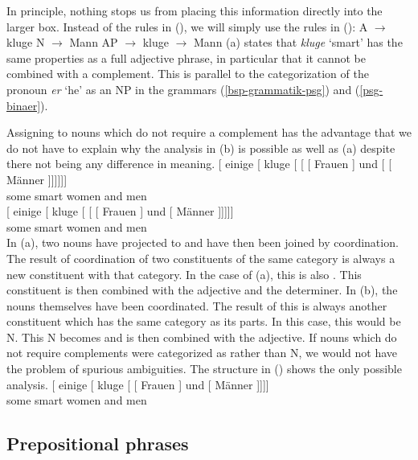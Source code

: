 In principle, nothing stops us from placing this information directly into the larger box. Instead of
the rules in (), we will simply use the rules in ():
\eal
\ex A $\to$ kluge
\ex N $\to$ Mann
\zl
\eal
\label{Lexikon-Projektion}
\ex AP $\to$ kluge
\ex \nbar $\to$ Mann
\zl
(a) states that \emph{kluge}  `smart' has the same properties as a full adjective phrase, in particular that it cannot be combined
with a complement. This is parallel to the categorization of the pronoun \emph{er} `he' as an NP in the grammars
(\ref{bsp-grammatik-psg}) and (\ref{psg-binaer}).

Assigning \nbar to nouns which do not require a complement has the advantage that we do not have to explain why the analysis in (b) is possible as well
as (a) despite there not being any difference in meaning.
\eal
\ex 
\gll {}[ einige [\sub{\nbar} kluge [\sub{\nbar} [\sub{\nbar} [ Frauen ] und  [\sub{\nbar} [ Männer ]]]]]]\\
	 {}      some   {}           smart {}          {}           {}       women  {} and {} {}          men\\
\ex 
\gll {}[ einige [\sub{\nbar} kluge [\sub{\nbar} [ [ Frauen ] und [ Männer
]]]]]\\
	{}       some   {}           smart {}          {}       {}       women  {} and {} men\\
\zl
%
In (a), two nouns have projected to \nbar and have then been joined by coordination. The result of coordination
of two constituents of the same category is always a new constituent with that category. In the case of (a), this
is also \nbar. This constituent is then combined with the adjective and the determiner. In (b), the nouns themselves
have been coordinated. The result of this is always another constituent which has the same category as its parts. In this case,
this would be N. This N becomes \nbar and is then combined with the adjective. If nouns which do not require complements were
categorized as \nbar rather than N, we would not have the problem of spurious ambiguities. The
structure in () shows the only possible analysis.
\ea
\gll {}[ einige [\sub{\nbar} kluge [\sub{\nbar} [\sub{\nbar} Frauen ] und [\sub{\nbar} Männer
]]]]\\
      {}	some    {}           smart {}          {}           women  {}  and {} men\\
\z

\subsection{Prepositional phrases}
\label{Abschnitt-PP-Syntax}

